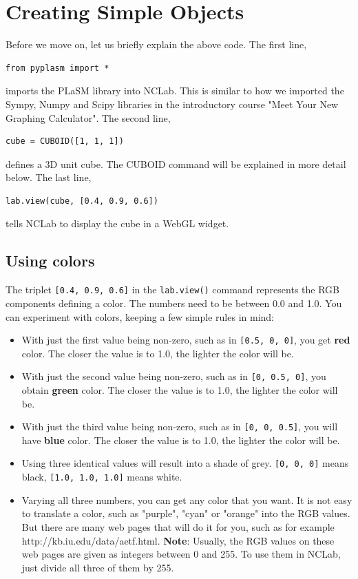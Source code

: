 \documentclass[article,A4,12pt]{llncs}
\begin{document}
\section{Creating Simple Objects}

Before we move on, let us briefly explain the above code.
The first line, 

\begin{verbatim}
from pyplasm import *
\end{verbatim}
imports the PLaSM library into NCLab. This is similar to how we imported
the Sympy, Numpy and Scipy libraries in the introductory course "Meet Your 
New Graphing Calculator". The second line,

\begin{verbatim}
cube = CUBOID([1, 1, 1])
\end{verbatim}
defines a 3D unit cube. The CUBOID command will be explained in more detail below.
The last line,

\begin{verbatim}
lab.view(cube, [0.4, 0.9, 0.6])
\end{verbatim}
tells NCLab to display the cube in a WebGL widget. 

\subsection{Using colors}

The triplet {\tt [0.4, 0.9, 0.6]} in the {\tt lab.view()} command
represents the RGB components defining a color. The numbers need to be between 
0.0 and 1.0. You can experiment with colors, keeping a few simple rules in mind:

\begin{itemize}
\item With just the first value being non-zero, such as in {\tt [0.5, 0, 0]},
      you get {\bf red} color. The closer the value is to 1.0, the lighter the color
      will be.
\item With just the second value being non-zero, such as in {\tt [0, 0.5, 0]},
      you obtain {\bf green} color. The closer the  value is to 1.0, the lighter the color
      will be.
\item With just the third value being non-zero, such as in {\tt [0, 0, 0.5]},
      you will have {\bf blue} color. The closer the  value is to 1.0, the lighter the color
      will be.
\item Using three identical values will result into a shade of grey. {\tt [0, 0, 0]}
      means black, {\tt [1.0, 1.0, 1.0]} means white.
\item Varying all three numbers, you can get any color that you want. It is not 
      easy to translate a color, such as "purple", "cyan" or "orange" into the RGB
      values. But there are many web pages that will do it for you, such as for
      example http://kb.iu.edu/data/aetf.html. {\bf Note}: Usually,
      the RGB values on these web pages are given as integers between 0 and 255. To use them in NCLab,
      just divide all three of them by 255.
\end{itemize}
\end{document}
